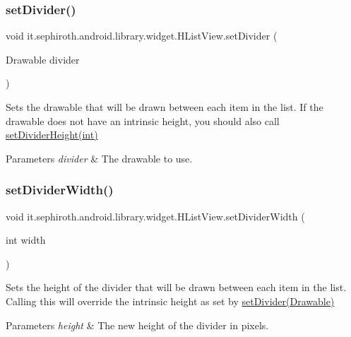 \subsubsection{\texorpdfstring{set\+Divider()}{setDivider()}}
{\footnotesize\ttfamily void it.\+sephiroth.\+android.\+library.\+widget.\+H\+List\+View.\+set\+Divider (\begin{DoxyParamCaption}\item[{Drawable}]{divider }\end{DoxyParamCaption})}

Sets the drawable that will be drawn between each item in the list. If the drawable does not have an intrinsic height, you should also call \hyperlink{}{set\+Divider\+Height(int)}


\begin{DoxyParams}{Parameters}
{\em divider} & The drawable to use. \\
\hline
\end{DoxyParams}
\mbox{\label{classit_1_1sephiroth_1_1android_1_1library_1_1widget_1_1_h_list_view_af8b514a0bddf2dcec7696aadc301de99}} 
\subsubsection{\texorpdfstring{set\+Divider\+Width()}{setDividerWidth()}}
{\footnotesize\ttfamily void it.\+sephiroth.\+android.\+library.\+widget.\+H\+List\+View.\+set\+Divider\+Width (\begin{DoxyParamCaption}\item[{int}]{width }\end{DoxyParamCaption})}

Sets the height of the divider that will be drawn between each item in the list. Calling this will override the intrinsic height as set by \hyperlink{classit_1_1sephiroth_1_1android_1_1library_1_1widget_1_1_h_list_view_a2a289047ef4485a4bed758c2bc3d0859}{set\+Divider(\+Drawable)}


\begin{DoxyParams}{Parameters}
{\em height} & The new height of the divider in pixels. \\
\hline
\end{DoxyParams}
\mbox{\label{classit_1_1sephiroth_1_1android_1_1library_1_1widget_1_1_h_list_view_a782ba3ad87997849ec74ee634070c06c}} 
